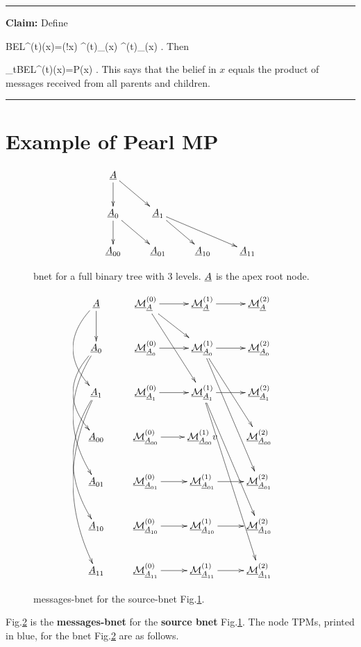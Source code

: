 \hrule\noindent
{\bf Claim:} Define

\beq
BEL^{(t)}(x)=\caln(!x)
\lam^{(t)}_{\rcond\rvx}(x)
\pi^{(t)}_{\rvx\lcond}(x)
\;.\eeq
Then

\beq
\lim_{t\rarrow \infty}BEL^{(t)}(x)=P(x)
\;.
\eeq
This  says that
the belief in $x$
equals the product 
of messages received from all
parents and children.


\hrule
\section*{Example of Pearl MP}

\begin{figure}[h!]
\centering
$$\xymatrix{
\rvA\ar[d]\ar[dr]
\\
\rvA_{0}\ar[d]\ar[dr]
&\rvA_{1}\ar[dr]\ar[drr]
\\
\rvA_{00}
&\rvA_{01}
&\rvA_{10}
&\rvA_{11}
}$$
\caption{bnet for a full binary 
tree with 3 levels. ${\underline{A}}$ is
the apex root node.}
\label{fig-full3-tree}
\end{figure}

\begin{figure}[h!]
\centering
$$\xymatrix{
\rvA\ar[d]\ar@/_2pc/[dd]
&\ucalm_\rvA^{(0)}\ar[rd]\ar[rdd]
\ar[r]
&\ucalm_\rvA^{(1)}
\ar[r]
&\ucalm_{\rvA}^{(2)}
\\
\rvA_{0}\ar@/_2pc/[dd]\ar@/_2pc/[ddd]
&\ucalm_{\rvA_{0}}^{(0)}
\ar[r]
&\ucalm_{\rvA_{0}}^{(1)}
\ar[r]\ar[rddd]\ar[rdd]
&\ucalm_{\rvA_{0}}^{(2)}
\\
\rvA_{1}\ar@/_2pc/[ddd]\ar@/_2pc/[dddd]
&\ucalm_{\rvA_{1}}^{(0)}
\ar[r]
&\ucalm_{\rvA_{1}}^{(1)}
\ar[rddd]\ar[rdddd]
\ar[r]
&\ucalm_{\rvA_{1}}^{(2)}
\\
\rvA_{00}
&\ucalm_{\rvA_{00}}^{(0)}
\ar[r]
&\ucalm_{\rvA_{00}}^{(1)}
v
&\ucalm_{\rvA_{00}}^{(2)}
\\
\rvA_{01}
&\ucalm_{\rvA_{01}}^{(0)}
\ar[r]
&\ucalm_{\rvA_{01}}^{(1)}
\ar[r]
&\ucalm_{\rvA_{01}}^{(2)}
\\
\rvA_{10}
&\ucalm_{\rvA_{10}}^{(0)}
\ar[r]
&\ucalm_{\rvA_{10}}^{(1)}
\ar[r]
&\ucalm_{\rvA_{10}}^{(2)}
\\
\rvA_{11}
&\ucalm_{\rvA_{11}}^{(0)}
\ar[r]
&\ucalm_{\rvA_{11}}^{(1)}
\ar[r]
&\ucalm_{\rvA_{11}}^{(2)}
}$$
\caption{messages-bnet
for the source-bnet Fig.\ref{fig-full3-tree}.}
\label{fig-mp-bnet-for-tree}
\end{figure}
Fig.\ref{fig-mp-bnet-for-tree} 
is the {\bf messages-bnet}
 for the 
{\bf source bnet} Fig.\ref{fig-full3-tree}.
The node TPMs,
printed in blue,
for the bnet
Fig.\ref{fig-mp-bnet-for-tree}
are as follows.


